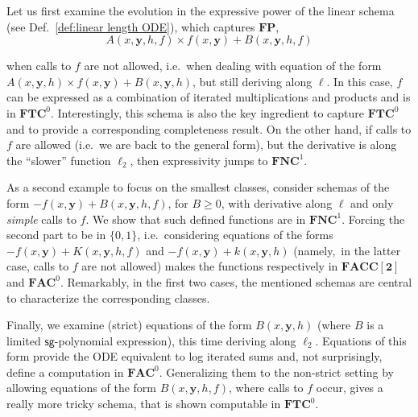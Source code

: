 \documentclass[11pt, oneside]{article}
\newcommand{\loglog}{\ell_2}
\newcommand{\FP}{\mathbf{FP}}
\newcommand{\NC}{\mathbf{FNC}}
\newcommand{\AC}{\mathbf{FAC}}
\newcommand{\TC}{\mathbf{FTC}}
\newcommand{\FACC}{\mathbf{FACC[2]}}
\newcommand{\sign}{\mathsf{sg}}
\newcommand{\tu}[1]{\mathbf{#1}}
\theoremstyle{definition}
\begin{document}
Let us first examine the evolution in the expressive power of the linear schema (see Def.~\ref{def:linear length ODE}), which captures $\FP$,
$$A(x,\tu y, h, f) \times  f(x, \tu y) + B(x, \tu y,  h, f)$$

\noindent
when calls to $f$ are not allowed, i.e.~when dealing with equation of the form $A(x,\tu y, h) \times f(x, \tu y) + B(x, \tu y,  h)$, but still deriving along $\ell$. 
%
In this case, $f$ can be expressed as a combination of iterated multiplications and products and is in $\TC^0$. 
%
Interestingly, this schema is also the key ingredient to capture $\TC^0$ and to provide a corresponding completeness result. 
%
On the other hand, if calls to $f$ are allowed (i.e.~we are back to the general form), but the derivative is along the ``slower'' function $\ell_2$, then expressivity jumps to $\NC^1$. 


As a second example to focus on the smallest classes, consider schemas of the form $-f(x,\tu y)+B(x,\tu y,h,f)$, for $B\ge 0$, with derivative along $\ell$ and only \textit{simple} calls to $f$. 
%
We show that such defined functions are in $\NC^1$. 
%
Forcing the second part to be in $\{0,1\}$, i.e.~considering equations of the forms $-f(x,\tu y)+K(x,\tu y,h,f)$ and $-f(x,\tu y)+k(x,\tu y,h)$ (namely,~in the latter case, calls to $f$ are not allowed) makes the functions respectively in $\FACC$ and $\AC^0$. 
%
Remarkably, in the first two cases, the mentioned schemas are central to characterize the corresponding classes.

Finally, we examine (strict) equations of the form $B(x,\tu y,h)$ (where $B$ is a limited $\sign$-polynomial expression), this time deriving along $\loglog$. 
%
Equations of this form provide the ODE equivalent to log iterated sums and, not surprisingly, define a computation in $\AC^0$. 
%
Generalizing them to the non-strict setting by allowing equations of the form $B(x,\tu y,h,f)$, where calls to $f$ occur, gives a really more tricky schema, that is shown computable in $\TC^0$.
\end{document}
